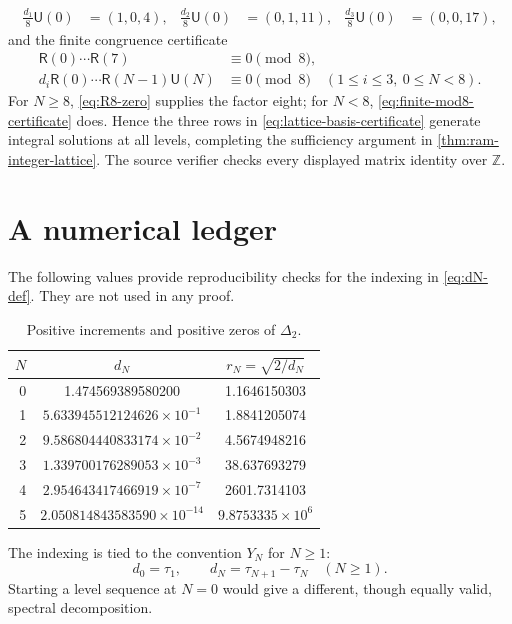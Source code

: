 \documentclass[11pt]{article}
\theoremstyle{definition}
\theoremstyle{remark}
\newcommand{\Z}{\mathbb Z}
\begin{document}
\begin{align}
 \frac{d_1}{8}\mathsf U(0)&=(1,0,4),&
 \frac{d_2}{8}\mathsf U(0)&=(0,1,11),&
 \frac{d_3}{8}\mathsf U(0)&=(0,0,17),
 \label{eq:lattice-basis-certificate}
\end{align}
and the finite congruence certificate
\begin{align}
 \mathsf R(0)\cdots\mathsf R(7)&\equiv0\pmod8,
 \label{eq:R8-zero}\\
 d_i\mathsf R(0)\cdots\mathsf R(N-1)\mathsf U(N)&\equiv0\pmod8
 \quad(1\le i\le3,\ 0\le N<8).
 \label{eq:finite-mod8-certificate}
\end{align}
For \(N\ge8\), \eqref{eq:R8-zero} supplies the factor eight; for
\(N<8\), \eqref{eq:finite-mod8-certificate} does.  Hence the three rows in
\eqref{eq:lattice-basis-certificate} generate integral solutions at all
levels, completing the sufficiency argument in
\cref{thm:ram-integer-lattice}.  The source verifier checks every displayed
matrix identity over \(\Z\).

\section{A numerical ledger}
\label{app:numerics}

The following values provide reproducibility checks for the indexing in
\eqref{eq:dN-def}.  They are not used in any proof.

\begin{table}[ht]
\centering
\caption{Positive increments and positive zeros of \(\Delta_2\).}
\begin{tabular}{@{}rcc@{}}
\toprule
\(N\)&\(d_N\)&\(r_N=\sqrt{2/d_N}\)\\
\midrule
0&1.474569389580200&1.1646150303\\
1&\(5.633945512124626\times10^{-1}\)&1.8841205074\\
2&\(9.586804440833174\times10^{-2}\)&4.5674948216\\
3&\(1.339700176289053\times10^{-3}\)&38.637693279\\
4&\(2.954643417466919\times10^{-7}\)&2601.7314103\\
5&\(2.050814843583590\times10^{-14}\)&\(9.8753335\times10^6\)\\
\bottomrule
\end{tabular}
\end{table}

The indexing is tied to the convention \(Y_N\) for \(N\ge1\):
\[
 d_0=\tau_1,\qquad d_N=\tau_{N+1}-\tau_N\quad(N\ge1).
\]
Starting a level sequence at \(N=0\) would give a different, though equally
valid, spectral decomposition.
\end{document}
